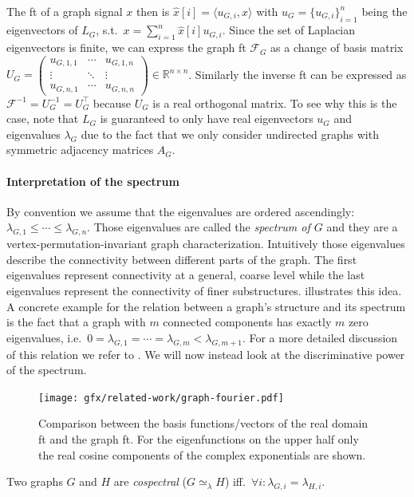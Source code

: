 The \ac{ft} of a graph signal $x$ then is $\hat{x}[i] = \langle u_{G,i}, x \rangle$ with $u_G = {\{ u_{G,i} \}}_{i=1}^{n}$ being the eigenvectors of $L_G$, s.t.\ $x = \sum_{i=1}^n \hat{x}[i] u_{G,i}$.
Since the set of Laplacian eigenvectors is finite, we can express the graph \ac{ft} $\mathcal{F}_G$ as a change of basis matrix $U_G = \begin{pmatrix} u_{G,1,1} & \cdots & u_{G,1,n} \\ \vdots & \ddots & \vdots \\ u_{G,n,1} & \cdots & u_{G,n,n} \end{pmatrix} \in \mathbb{R}^{n \times n}$.
Similarly the inverse \ac{ft} can be expressed as $\mathcal{F}^{-1} = U_G^{-1} = U_G^{\top}$ because $U_G$ is a real orthogonal matrix.
To see why this is the case, note that $L_G$ is guaranteed to only have real eigenvectors $u_G$ and eigenvalues $\lambda_G$ due to the fact that we only consider undirected graphs with symmetric adjacency matrices $A_G$.

\paragraph{Interpretation of the spectrum}
By convention we assume that the eigenvalues are ordered ascendingly: $\lambda_{G,1} \leq \cdots \leq \lambda_{G,n}$.
Those eigenvalues are called the \textit{spectrum of $G$} and they are a vertex-permutation-invariant graph characterization.
Intuitively those eigenvalues describe the connectivity between different parts of the graph.
The first eigenvalues represent connectivity at a general, coarse level while the last eigenvalues represent the connectivity of finer substructures.
 illustrates this idea.
A concrete example for the relation between a graph's structure and its spectrum is the fact that a graph with $m$ connected components has exactly $m$ zero eigenvalues, i.e.\ $0 = \lambda_{G,1} = \cdots = \lambda_{G,m} < \lambda_{G,m+1}$.
For a more detailed discussion of this relation we refer to \citet{Das2004}.
We will now instead look at the discriminative power of the spectrum.
\begin{figure}[ht]
	\centering
	\texttt{[image: gfx/related-work/graph-fourier.pdf]}
	\caption[Comparison between the basis vectors of the real domain \acl{ft} and the graph \acl{ft}.]{
		Comparison between the basis functions/vectors of the real domain \ac{ft} and the graph \ac{ft}.
		For the eigenfunctions on the upper half only the real cosine components of the complex exponentials are shown.
	}\label{fig:related:graph-fourier}
\end{figure}
\begin{defn}\label{defn:related:cospectral}
	Two graphs $G$ and $H$ are \textit{cospectral} ($G \mathrel{\simeq_\lambda} H$) iff.\ $\forall i: \lambda_{G,i} = \lambda_{H,i}$.
\end{defn}

